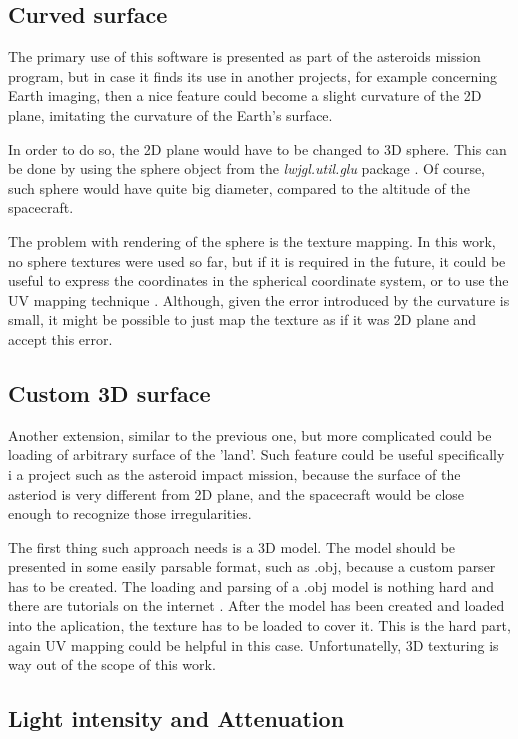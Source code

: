 \documentclass[english,12pt,a4paper,pdftex,elec,utf8]{aaltothesis}
\begin{document}
\subsection*{Curved surface}

The primary use of this software is presented as part of the asteroids mission program, but in case it finds its use in another projects, for example concerning Earth imaging, then a nice feature could become a slight curvature of the 2D plane, imitating the curvature of the Earth's surface. 

In order to do so, the 2D plane would have to be changed to 3D sphere. This can be done by using the sphere object from the \textit{lwjgl.util.glu} package \cite{lwjglSphere}. Of course, such sphere would have quite big diameter, compared to the altitude of the spacecraft. 

The problem with rendering of the sphere is the texture mapping. In this work, no sphere textures were used so far, but if it is required in the future, it could be useful to express the coordinates in the spherical coordinate system, or to use the UV mapping technique \cite{UVmappingWiki}. Although, given the error introduced by the curvature is small, it might be possible to just map the texture as if it was 2D plane and accept this error.

\subsection*{Custom 3D surface}

Another extension, similar to the previous one, but more complicated could be loading of arbitrary surface of the 'land'. Such feature could be useful specifically i a project such as the asteroid impact mission, because the surface of the asteriod is very different from 2D plane, and the spacecraft would be close enough to recognize those irregularities.

The first thing such approach needs is a 3D model. The model should be presented in some easily parsable format, such as .obj, because a custom parser has to be created. The loading and parsing of a .obj model is nothing hard and there are tutorials on the internet \cite{Load3DModel}. After the model has been created and loaded into the aplication, the texture has to be loaded to cover it. This is the hard part, again UV mapping\cite{UVmappingWiki} could be helpful in this case. Unfortunatelly, 3D texturing is way out of the scope of this work. 

\subsection*{Light intensity and Attenuation}
\end{document}
